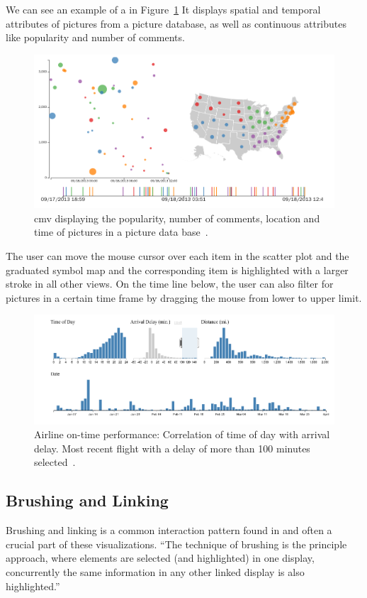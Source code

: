 We can see an example of a \cmv{} in Figure~\ref{fig:related-work:cmv}
It displays spatial and temporal attributes of pictures from a picture database, as well as continuous attributes like popularity and number of comments.
\begin{figure}[h]
  \centering
  \includegraphics[width=\textwidth]{figures/related-work/cmv}
  \caption{\gls{cmv} displaying the popularity, number of comments, location and time of pictures in a picture data base~\parencite{Dukevis2017}.}
  \label{fig:related-work:cmv}
\end{figure}
The user can move the mouse cursor over each item in the scatter plot and the graduated symbol map and the corresponding item is highlighted with a larger stroke in all other views.
On the time line below, the user can also filter for pictures in a certain time frame by dragging the mouse from lower to upper limit.

\begin{figure}[h]
  \centering
  \includegraphics[width=\textwidth]{figures/related-work/brushing_linking}
  \caption{Airline on-time performance: Correlation of time of day with arrival delay. Most recent flight with a delay of more than 100 minutes selected~\parencite{Bostock2017}.}
  \label{fig:research:brushing-linking}
\end{figure}

\subsection{Brushing and Linking}
Brushing and linking is a common interaction pattern found in \cmvs{} and often a crucial part of these visualizations.
``The technique of brushing is the principle approach, where elements are selected (and highlighted) in one display, concurrently the same information in any other linked display is also highlighted.''~\parencite{Roberts2007}

